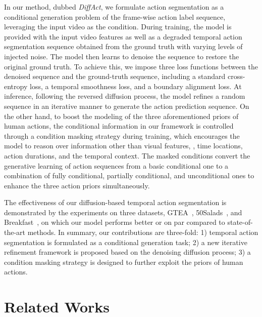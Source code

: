 \documentclass[10pt,twocolumn,letterpaper]{article}
\begin{document}
In our method, dubbed \textit{DiffAct}, we formulate action segmentation as a conditional generation problem of the frame-wise action label sequence, leveraging the input video as the condition.
During training, the model is provided with the input video features as well as a degraded temporal action segmentation sequence obtained from the ground truth with varying levels of injected noise.
The model then learns to denoise the sequence to restore the original ground truth.
To achieve this, we impose three loss functions between the denoised sequence and the ground-truth sequence, including a standard cross-entropy loss, a temporal smoothness loss, and a boundary alignment loss.
At inference, following the reversed diffusion process, the model refines a random sequence in an iterative manner to generate the action prediction sequence.
On the other hand, to boost the modeling of the three aforementioned priors of human actions, the conditional information in our framework is controlled through a condition masking strategy during training, which encourages the model to reason over information other than visual features, \eg, time locations, action durations, and the temporal context.
The masked conditions convert the generative learning of action sequences from a basic conditional one to a combination of fully conditional, partially conditional, and unconditional ones to enhance the three action priors simultaneously.

The effectiveness of our diffusion-based temporal action segmentation is demonstrated by the experiments on three datasets, GTEA~\cite{GTEA}, 50Salads~\cite{50Salads}, and Breakfast~\cite{Breakfast}, on which our model performs better or on par compared to state-of-the-art methods. 
In summary, our contributions are three-fold:
1) temporal action segmentation is formulated as a conditional generation task;
2) a new iterative refinement framework is proposed based on the denoising diffusion process;
3) a condition masking strategy is designed to further exploit the priors of human actions.

\section{Related Works}
\end{document}
